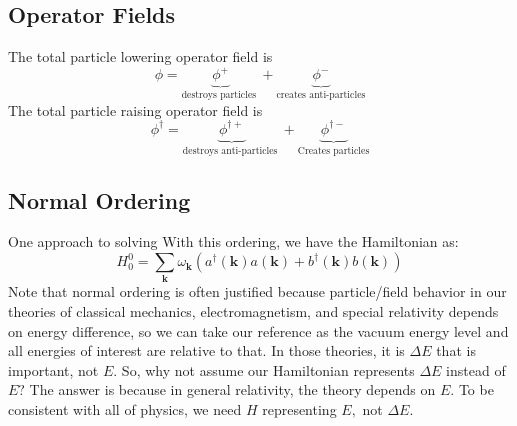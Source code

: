 \subsection{Operator Fields}
The total particle lowering operator field is
\begin{equation}
\phi=\underbrace{\phi^{+}}_{\text {destroys particles }}+\underbrace{\phi^{-}}_{\text {creates anti-particles}}
\end{equation}
The total particle raising operator field is
\begin{equation}
\phi^{\dagger}=\underbrace{\phi^{\dagger+}}_{\text {destroys anti-particles }}+\underbrace{\phi^{\dagger-}}_{\text {Creates particles}}
\end{equation}
\subsection{Normal Ordering}
One approach to solving   With this ordering, we have the Hamiltonian as:
\begin{equation}
H_{0}^{0}=\sum_{\mathbf{k}} \omega_{\mathbf{k}}\left(a^{\dagger}(\mathbf{k}) a(\mathbf{k})+b^{\dagger}(\mathbf{k}) b(\mathbf{k})\right)
\end{equation}
Note that normal ordering is often justified because particle/field behavior in our theories of classical mechanics, electromagnetism, and special relativity depends on energy difference, so we can take our reference as the vacuum energy level and all energies of interest are relative to that. In those theories, it is $\Delta E$ that is important, not $E .$ So, why not assume our Hamiltonian represents $\Delta E$ instead of $E ?$ The answer is because in general relativity, the theory depends on $E .$ To be consistent with all of physics, we need $H$ representing $E,$ not $\Delta E$.

